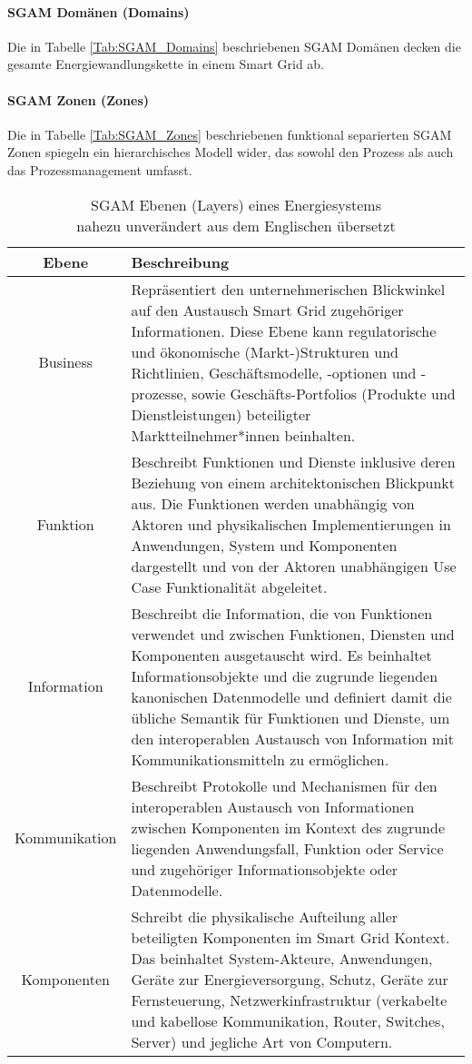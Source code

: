 	\paragraph{SGAM Domänen (Domains)}		
		Die in Tabelle \ref{Tab:SGAM_Domains} beschriebenen SGAM Domänen decken die gesamte Energiewandlungskette in einem Smart Grid ab. 
	
	\paragraph{SGAM Zonen (Zones)}
		Die in Tabelle \ref{Tab:SGAM_Zones} beschriebenen funktional separierten SGAM Zonen spiegeln ein hierarchisches Modell wider, das sowohl den Prozess als auch das Prozessmanagement umfasst. 
	
		\begin{table}
			\begin{tabularx}{\linewidth}{|c|X|}
				\hline 
				\textbf{Ebene} 				& \textbf{Beschreibung}   \\ 
				\hline 
				Business 				& Repräsentiert den unternehmerischen Blickwinkel auf den Austausch Smart Grid zugehöriger Informationen. Diese Ebene kann regulatorische und ökonomische (Markt-)Strukturen und Richtlinien, Geschäftsmodelle, -optionen und -prozesse, sowie Geschäfts-Portfolios (Produkte und Dienstleistungen) beteiligter Marktteilnehmer*innen beinhalten. \\
				\hline 
				Funktion 		& Beschreibt Funktionen und Dienste inklusive deren Beziehung von einem architektonischen Blickpunkt aus. Die Funktionen werden unabhängig von Aktoren und physikalischen Implementierungen in Anwendungen, System und Komponenten dargestellt und von der Aktoren unabhängigen Use Case Funktionalität abgeleitet. \\
				\hline
				Information		& Beschreibt die Information, die von Funktionen verwendet und zwischen Funktionen, Diensten und Komponenten ausgetauscht wird. Es beinhaltet Informationsobjekte und die zugrunde liegenden kanonischen Datenmodelle und definiert damit die übliche Semantik für Funktionen und Dienste, um den interoperablen Austausch von Information mit Kommunikationsmitteln zu ermöglichen. \\
				\hline
				Kommunikation		 			& Beschreibt Protokolle und Mechanismen für den interoperablen Austausch von Informationen zwischen Komponenten im Kontext des zugrunde liegenden Anwendungsfall, Funktion oder Service und zugehöriger Informationsobjekte oder Datenmodelle. \\
				\hline
				Komponenten 			& Schreibt die physikalische Aufteilung aller beteiligten Komponenten im Smart Grid Kontext. Das beinhaltet System-Akteure, Anwendungen, Geräte zur Energieversorgung, Schutz, Geräte zur Fernsteuerung, Netzwerkinfrastruktur (verkabelte und kabellose Kommunikation, Router, Switches, Server) und jegliche Art von Computern.  \\
				\hline 
				
			\end{tabularx}
			\caption{SGAM Ebenen (Layers) eines Energiesystems \\ nahezu unverändert aus dem Englischen übersetzt \cite[S.27]{CENELEC_SmartGrid}}
			\label{Tab:SGAM_Layers}
		\end{table}	

